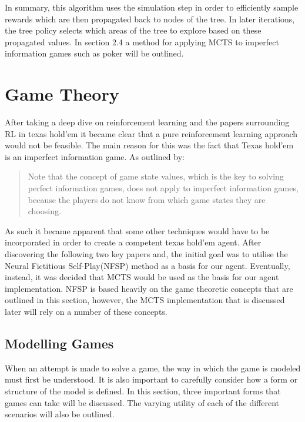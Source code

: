 In summary, this algorithm uses the simulation step in order to efficiently sample rewards which
are then propagated back to nodes of the tree.
In later iterations, the tree policy selects which areas of the tree to
explore based on these propagated values.
In section 2.4 a method for applying MCTS to imperfect information games such as poker will be outlined.

\section{Game Theory}\label{sec:gameTheory}
After taking a deep dive on reinforcement learning and the papers surrounding RL in texas hold'em it became
clear that a pure reinforcement learning approach would not be feasible.
The main reason for this was the fact that Texas hold'em is an imperfect information game.
As outlined by\citep{dahl2001reinforcement}:
\begin{quotation}
    Note that the concept of game state values, which is the key to solving perfect information games,
    does not apply to imperfect information games, because the players do not know from  which game states they
    are choosing.
\end{quotation}
As such it became apparent that some other techniques would have to be incorporated in order to create a competent
texas hold'em agent.
After discovering the following two key papers\citep{heinrich2016deep} and\citep{heinrich2017reinforcement},
the initial goal was to utilise the Neural Fictitious Self-Play(NFSP) method as a basis for our agent.
Eventually, instead, it was decided that MCTS would be used as the basis for our agent implementation.
NFSP is based heavily on the game theoretic concepts that are outlined in this section, however,
the MCTS implementation that is discussed later will rely on a number of these concepts.

\subsection{Modelling Games}\label{subsec:modellingGames}
When an attempt is made to solve a game, the way in which the game is modeled must first be understood.
It is also important to carefully consider how a form or structure of the model is defined\citep{myerson2013game}.
In this section, three important forms that games can take will be discussed.
The varying utility of each of the different scenarios will also be outlined.

